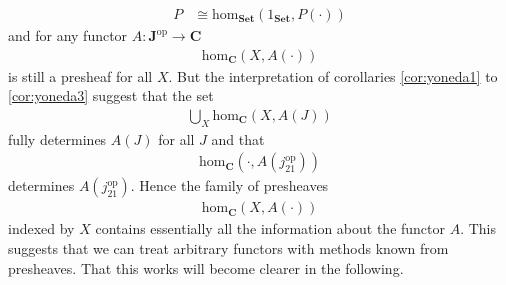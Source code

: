 \begin{align*}
  P
  &\cong
  \mathrm{hom}_{\mathbf{Set}}(1_{\mathbf{Set}},P(\cdot))
\end{align*}
and for any functor $A \colon \mathbf{J}^{\textrm{op}} \to \mathbf{C}$
\begin{align*}
  \mathrm{hom}_{\mathbf{C}}(X,A(\cdot))
\end{align*}
is still a presheaf for all $X$. But the interpretation of corollaries \ref{cor:yoneda1} to \ref{cor:yoneda3} suggest that the set
\begin{align*}
  \bigcup_{X}
  \mathrm{hom}_{\mathbf{C}}(X,A(J))
\end{align*}
fully determines $A(J)$ for all $J$ and that
\begin{align*}
  \mathrm{hom}_{\mathbf{C}}
  \left(
    \cdot,
    A(j_{21}^{\textrm{op}})
  \right)
\end{align*}
determines $A(j_{21}^{\textrm{op}})$. Hence the family of presheaves
\begin{align*}
  \mathrm{hom}_{\mathbf{C}}(X,A(\cdot))
\end{align*}
indexed by $X$ contains essentially all the information about the functor $A$. This suggests that we can treat arbitrary functors with methods known from presheaves. That this works will become clearer in the following.
\\
